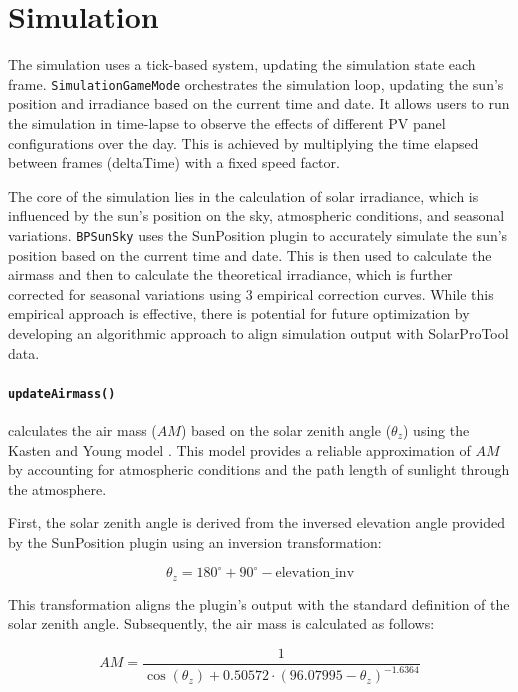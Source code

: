 \documentclass[draft, final]{vutinfth} %
\begin{document}
\section{Simulation}

The simulation uses a tick-based system, updating the simulation state each frame. \lstinline|SimulationGameMode| orchestrates the simulation loop, updating the sun's position and irradiance based on the current time and date. It allows users to run the simulation in time-lapse to observe the effects of different PV panel configurations over the day. This is achieved by multiplying the time elapsed between frames (deltaTime) with a fixed speed factor.

The core of the simulation lies in the calculation of solar irradiance, which is influenced by the sun's position on the sky, atmospheric conditions, and seasonal variations. \lstinline|BPSunSky| uses the SunPosition plugin to accurately simulate the sun's position based on the current time and date. This is then used to calculate the airmass and then to calculate the theoretical irradiance, which is further corrected for seasonal variations using 3 empirical correction curves. While this empirical approach is effective, there is potential for future optimization by developing an algorithmic approach to align simulation output with SolarProTool data.

\paragraph{\lstinline|updateAirmass()|} calculates the air mass ($AM$) based on the solar zenith angle ($\theta_z$) using the Kasten and Young model \cite{Kasten1989airmass}. This model provides a reliable approximation of $AM$ by accounting for atmospheric conditions and the path length of sunlight through the atmosphere.

First, the solar zenith angle is derived from the inversed elevation angle provided by the SunPosition plugin using an inversion transformation:

\begin{equation} \label{eq:theta_z}
\theta_z = 180^\circ + 90^\circ - \text{elevation\_inv}
\end{equation}

This transformation aligns the plugin's output with the standard definition of the solar zenith angle. Subsequently, the air mass is calculated as follows:

\begin{equation} \label{eq:airmass}
AM = \frac{1}{\cos(\theta_z) + 0.50572 \cdot (96.07995 - \theta_z)^{-1.6364}}
\end{equation}
\end{document}
